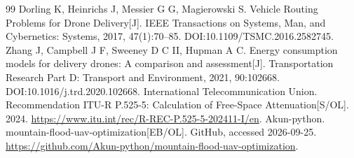 \begin{thebibliography}{99}
 Dorling K, Heinrichs J, Messier G G, Magierowski S. Vehicle Routing Problems for Drone Delivery[J]. IEEE Transactions on Systems, Man, and Cybernetics: Systems, 2017, 47(1):70--85. DOI:10.1109/TSMC.2016.2582745.
 Zhang J, Campbell J F, Sweeney D C II, Hupman A C. Energy consumption models for delivery drones: A comparison and assessment[J]. Transportation Research Part D: Transport and Environment, 2021, 90:102668. DOI:10.1016/j.trd.2020.102668.
 International Telecommunication Union. Recommendation ITU-R P.525-5: Calculation of Free-Space Attenuation[S/OL]. 2024. \url{https://www.itu.int/rec/R-REC-P.525-5-202411-I/en}.
 Akun-python. mountain-flood-uav-optimization[EB/OL]. GitHub, accessed 2026-09-25. \url{https://github.com/Akun-python/mountain-flood-uav-optimization}.
\end{thebibliography}
